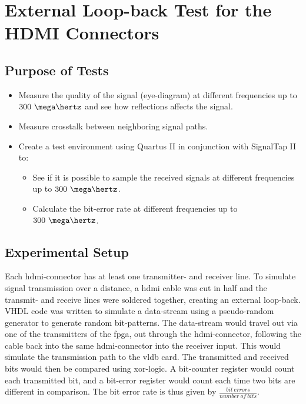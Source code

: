 \documentclass[main.tex]{subfiles}
\begin{document}
\section{External Loop-back Test for the HDMI Connectors}

\subsection{Purpose of Tests}

\begin{itemize}\setlength{\itemsep}{10pt}
\item Measure the quality of the signal (eye-diagram) at different frequencies up to $300~\mega\hertz$ and see how reflections affects the signal.
\item Measure crosstalk between neighboring signal paths.
\item Create a test environment using Quartus II in conjunction with SignalTap II to:
\begin{itemize}\setlength{\itemsep}{10pt}
  \item See if it is possible to sample the received signals at different frequencies up to $300~\mega\hertz$.
  \item Calculate the bit-error rate at different frequencies up to $300~\mega\hertz$.
\end{itemize}
\end{itemize}

\subsection{Experimental Setup}

Each \gls{hdmi}-connector has at least one transmitter- and receiver line. To simulate signal transmission over a distance, a \gls{hdmi} cable was cut in half and the transmit- and receive lines were soldered together, creating an external loop-back. VHDL code was written to simulate a data-stream using a pseudo-random generator to generate random bit-patterns. The data-stream would travel out via one of the transmitters of the \gls{fpga}, out through the \gls{hdmi}-connector, following the cable back into the same \gls{hdmi}-connector into the receiver input. This would simulate the transmission path to the \gls{vldb} card. The transmitted and received bits would then be compared using xor-logic. A bit-counter register would count each transmitted bit, and a bit-error register would count each time two bits are different in comparison. The bit error rate is thus given by $\frac{bit~errors}{number~of~bits}$.
\end{document}
